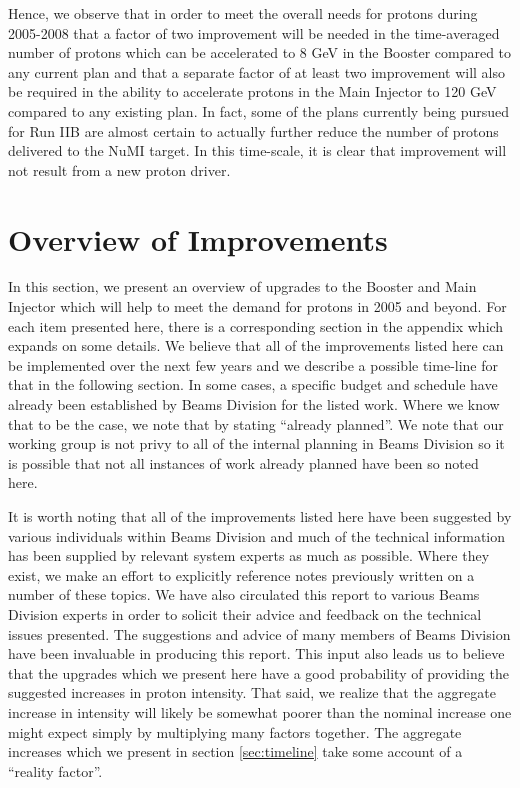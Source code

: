\documentclass{article}
\begin{document}
Hence, we observe that in order to meet the overall needs for protons
during 2005-2008
that a factor of two improvement will be needed in the time-averaged
number of protons
which can be accelerated to 8 GeV in the Booster compared to any current
plan and that a separate
factor of at least two improvement will also be required in the
ability to accelerate protons in the Main Injector to 120 GeV compared to any
existing plan. In fact, some of the plans currently being pursued for Run IIB
are almost certain to actually further reduce the number of protons delivered
to the NuMI target. In this time-scale, it is clear that improvement will
not result from a new proton driver. 

\section {Overview of Improvements}

In this section, we present an overview of upgrades to the Booster
and Main Injector which will help to meet the demand for protons in 2005 
and beyond. For each item presented here, there is a corresponding 
section in the appendix which expands on some details. We believe that
all of the improvements listed here can be implemented over the next
few years and we describe a possible time-line for that in the following
section. In some cases,
a specific budget and schedule have already been established by Beams Division
for the listed work. Where we know that to be the case,
 we note that by stating ``already planned''. We note that our working group
is not privy to all of the internal planning in Beams Division so it is
possible that not all instances of work already planned have been so noted
here. 

It is worth noting that all of the improvements listed here have been suggested
by various individuals within Beams Division and much of the technical
information has been supplied by relevant system experts as much as possible.
Where they exist, we make an effort to explicitly reference notes previously
written on a number of these topics. We have also circulated this report
to various Beams Division experts in order to solicit their advice and 
feedback on the technical issues presented. The suggestions and advice of
many members of Beams Division have been invaluable in producing this 
report. This input also leads us to believe that the upgrades which we
present here have a good probability of providing the suggested increases
in proton intensity. That said, we realize that the aggregate increase
in intensity will likely be somewhat poorer than the nominal increase
one might expect simply by multiplying many factors together. The aggregate
increases which we present in section \ref {sec:timeline} 
take some account of a ``reality factor''. 
\end{document}
